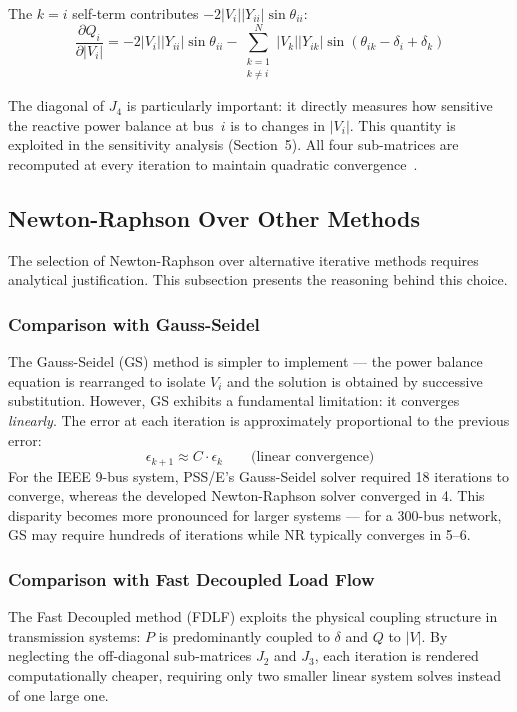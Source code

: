\documentclass[12pt, a4paper]{article}
\begin{document}
The $k = i$ self-term contributes $-2|V_i||Y_{ii}|\sin\theta_{ii}$:
\begin{equation}
\frac{\partial Q_i}{\partial |V_i|} = -2|V_i| |Y_{ii}| \sin\theta_{ii} - \sum_{\substack{k=1 \\ k \neq i}}^{N} |V_k| |Y_{ik}| \sin(\theta_{ik} - \delta_i + \delta_k)
\label{eq:J4_diag}
\end{equation}

The diagonal of $J_4$ is particularly important: it directly measures how sensitive the reactive power balance at bus~$i$ is to changes in $|V_i|$. This quantity is exploited in the sensitivity analysis (Section~5). All four sub-matrices are recomputed at every iteration to maintain quadratic convergence~\cite{tinney1967}.

\subsection{Newton-Raphson Over Other Methods}

The selection of Newton-Raphson over alternative iterative methods requires analytical justification. This subsection presents the reasoning behind this choice.

\subsubsection{Comparison with Gauss-Seidel}
The Gauss-Seidel (GS) method is simpler to implement --- the power balance equation is rearranged to isolate $V_i$ and the solution is obtained by successive substitution. However, GS exhibits a fundamental limitation: it converges \textit{linearly}. The error at each iteration is approximately proportional to the previous error:
\begin{equation}
\epsilon_{k+1} \approx C \cdot \epsilon_k \qquad \text{(linear convergence)}
\end{equation}
For the IEEE 9-bus system, PSS/E's Gauss-Seidel solver required 18 iterations to converge, whereas the developed Newton-Raphson solver converged in 4. This disparity becomes more pronounced for larger systems --- for a 300-bus network, GS may require hundreds of iterations while NR typically converges in 5--6.

\subsubsection{Comparison with Fast Decoupled Load Flow}
The Fast Decoupled method (FDLF) exploits the physical coupling structure in transmission systems: $P$ is predominantly coupled to $\delta$ and $Q$ to $|V|$. By neglecting the off-diagonal sub-matrices $J_2$ and $J_3$, each iteration is rendered computationally cheaper, requiring only two smaller linear system solves instead of one large one.
\end{document}
